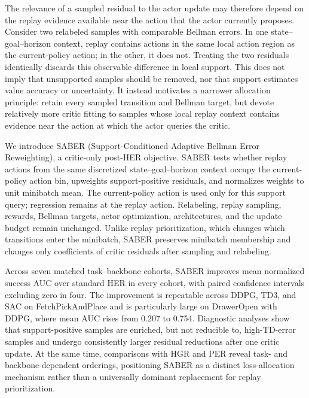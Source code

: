\documentclass[letterpaper]{article}
\begin{document}
The relevance of a sampled residual to the actor update may therefore depend on the replay evidence available near the action that the actor currently proposes. Consider two relabeled samples with comparable Bellman errors. In one state--goal--horizon context, replay contains actions in the same local action region as the current-policy action; in the other, it does not. Treating the two residuals identically discards this observable difference in local support. This does not imply that unsupported samples should be removed, nor that support estimates value accuracy or uncertainty. It instead motivates a narrower allocation principle: retain every sampled transition and Bellman target, but devote relatively more critic fitting to samples whose local replay context contains evidence near the action at which the actor queries the critic.

We introduce SABER (Support-Conditioned Adaptive Bellman Error Reweighting), a critic-only post-HER objective. SABER tests whether replay actions from the same discretized state--goal--horizon context occupy the current-policy action bin, upweights support-positive residuals, and normalizes weights to unit minibatch mean. The current-policy action is used only for this support query; regression remains at the replay action. Relabeling, replay sampling, rewards, Bellman targets, actor optimization, architectures, and the update budget remain unchanged. Unlike replay prioritization, which changes which transitions enter the minibatch, SABER preserves minibatch membership and changes only coefficients of critic residuals after sampling and relabeling.

Across seven matched task--backbone cohorts, SABER improves mean normalized success AUC over standard HER in every cohort, with paired confidence intervals excluding zero in four. The improvement is repeatable across DDPG, TD3, and SAC on FetchPickAndPlace and is particularly large on DrawerOpen with DDPG, where mean AUC rises from 0.207 to 0.754. Diagnostic analyses show that support-positive samples are enriched, but not reducible to, high-TD-error samples and undergo consistently larger residual reductions after one critic update. At the same time, comparisons with HGR and PER reveal task- and backbone-dependent orderings, positioning SABER as a distinct loss-allocation mechanism rather than a universally dominant replacement for replay prioritization.
\end{document}
